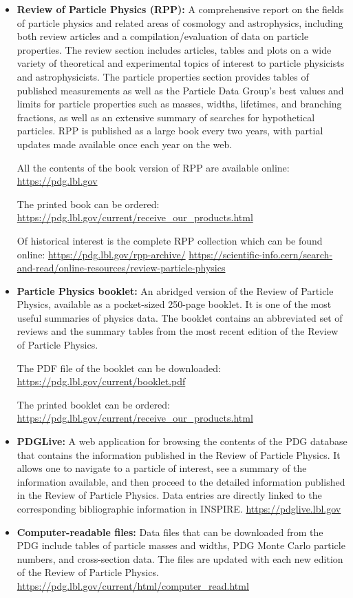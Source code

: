 \begin{itemize}
\item
  \textbf{Review of Particle Physics (RPP):} A comprehensive report on
  the fields of particle physics and related areas of cosmology and
  astrophysics, including both review articles and a
  compilation/evaluation of data on particle properties. The review
  section includes articles, tables and plots on a wide variety of
  theoretical and experimental topics of interest to particle physicists
  and astrophysicists. The particle properties section provides tables
  of published measurements as well as the Particle Data Group's best
  values and limits for particle properties such as masses, widths,
  lifetimes, and branching fractions, as well as an extensive summary of
  searches for hypothetical particles. RPP is published as a large book
  every two years, with partial updates made available once each year on
  the web.

  All the contents of the book version of RPP are available online:
  \url{https://pdg.lbl.gov}

  The printed book can be ordered:
  \url{https://pdg.lbl.gov/current/receive_our_products.html}

  Of historical interest is the complete RPP collection which can be
  found online: \url{https://pdg.lbl.gov/rpp-archive/}
  \url{https://scientific-info.cern/search-and-read/online-resources/review-particle-physics}
\item
  \textbf{Particle Physics booklet:} An abridged version of the Review
  of Particle Physics, available as a pocket-sized 250-page booklet. It
  is one of the most useful summaries of physics data. The booklet
  contains an abbreviated set of reviews and the summary tables from the
  most recent edition of the Review of Particle Physics.

  The PDF file of the booklet can be downloaded:
  \url{https://pdg.lbl.gov/current/booklet.pdf}

  The printed booklet can be ordered:
  \url{https://pdg.lbl.gov/current/receive_our_products.html}
\item
{}
  \textbf{PDGLive:} A web application for browsing the contents of the
  PDG database that contains the information published in the Review of
  Particle Physics. It allows one to navigate to a particle of interest,
  see a summary of the information available, and then proceed to the
  detailed information published in the Review of Particle Physics. Data
  entries are directly linked to the corresponding bibliographic
  information in INSPIRE. \url{https://pdglive.lbl.gov}
\item
{}
  \textbf{Computer-readable files:} Data files that can be downloaded
  from the PDG include tables of particle masses and widths, PDG Monte
  Carlo particle numbers, and cross-section data. The files are updated
  with each new edition of the Review of Particle Physics.
  \url{https://pdg.lbl.gov/current/html/computer_read.html}
\end{itemize}

